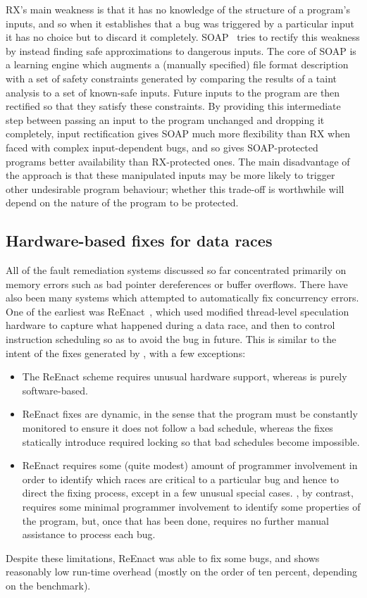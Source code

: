 RX's main weakness is that it has no knowledge of the structure of a
program's inputs, and so when it establishes that a bug was triggered
by a particular input it has no choice but to discard it completely.
SOAP~\cite{Long2012} tries to rectify this weakness by instead finding
safe approximations to dangerous inputs.  The core of SOAP is a
learning engine which augments a (manually specified) file format
description with a set of safety constraints generated by comparing
the results of a taint analysis to a set of known-safe inputs.  Future
inputs to the program are then rectified so that they satisfy these
constraints.  By providing this intermediate step between passing an
input to the program unchanged and dropping it completely, input
rectification gives SOAP much more flexibility than RX when faced with
complex input-dependent bugs, and so gives SOAP-protected programs
better availability than RX-protected ones.  The main disadvantage of
the approach is that these manipulated inputs may be more likely to
trigger other undesirable program behaviour; whether this trade-off is
worthwhile will depend on the nature of the program to be protected.

\subsection{Hardware-based fixes for data races}
All of the fault remediation systems discussed so far concentrated
primarily on memory errors such as bad pointer dereferences or buffer
overflows.  There have also been many systems which attempted to
automatically fix concurrency errors.  One of the earliest was
ReEnact~\cite{Prvulovic2003a}, which used modified thread-level
speculation hardware to capture what happened during a data race, and
then to control instruction scheduling so as to avoid the bug in
future.  This is similar to the intent of the fixes generated by
{\technique}, with a few exceptions:
\begin{itemize}
\item The ReEnact scheme requires unusual hardware support, whereas
  {\technique} is purely software-based.
\item ReEnact fixes are dynamic, in the sense that the program must be
  constantly monitored to ensure it does not follow a bad schedule,
  whereas the {\technique} fixes statically introduce required locking
  so that bad schedules become impossible.
\item ReEnact requires some (quite modest) amount of programmer
  involvement in order to identify which races are critical to a
  particular bug and hence to direct the fixing process, except in a
  few unusual special cases.  {\Technique}, by contrast, requires some
  minimal programmer involvement to identify some properties of the
  program, but, once that has been done, requires no further manual
  assistance to process each bug.
\end{itemize}
Despite these limitations, ReEnact was able to fix some bugs, and
shows reasonably low run-time overhead (mostly on the order of ten
percent, depending on the benchmark).

